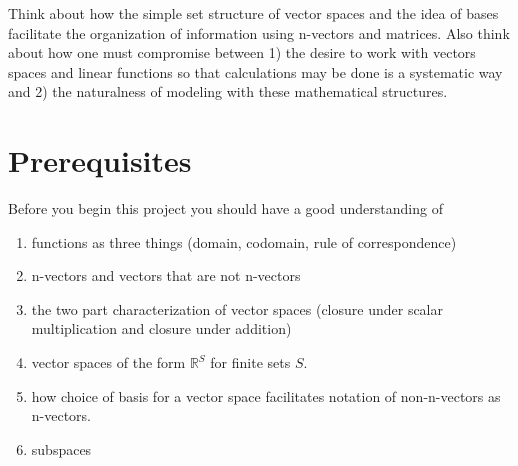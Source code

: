 \documentclass[12pt]{article}
\def\R{{\mathbb{R}}}
\begin{document}
Think about how the simple set structure of vector spaces and the idea of bases facilitate the organization of information using n-vectors and matrices. 
Also think about how one must compromise between 1) the desire to work with vectors spaces and linear functions so that calculations may be done is a systematic way and 2) the naturalness of modeling with these mathematical structures. 


\newpage

\section{Prerequisites}
Before you begin this project you should have a good understanding of 
\begin{enumerate}
\item functions as three things (domain, codomain, rule of correspondence) 
\item n-vectors and vectors that are not n-vectors
\item the two part characterization of vector spaces (closure under scalar multiplication and closure under addition)
\item vector spaces of the form $\R^S$ for finite sets $S$.
\item how choice of basis for a vector space facilitates notation of non-n-vectors as n-vectors. 
\item subspaces 
\end{enumerate}






%
%




\newpage
\end{document}
